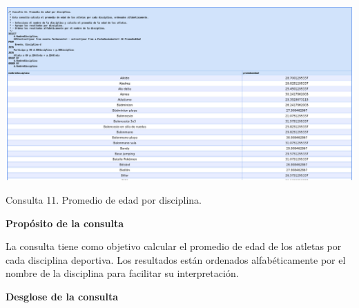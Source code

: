 \begin{center}
	\includegraphics[width=16.5cm]{resources/Chapters/Consultas/Imagenes/Consulta11.jpg} 
	
	Consulta 11. Promedio de edad por disciplina.
\end{center}

\textbf{Propósito de la consulta}

La consulta tiene como objetivo calcular el promedio de edad de los atletas por cada disciplina deportiva. Los resultados están ordenados alfabéticamente por el nombre de la disciplina para facilitar su interpretación.

\textbf{Desglose de la consulta}

